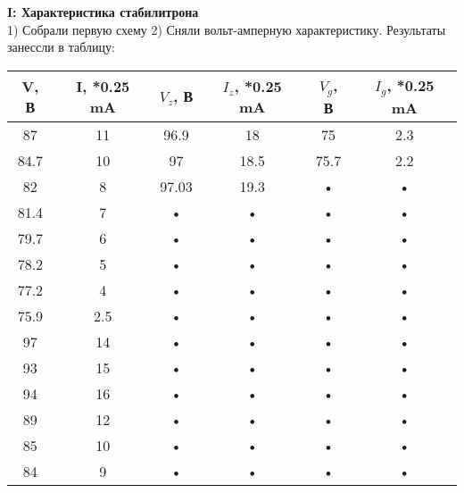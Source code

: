 \documentclass[a4paper,12pt]{article} %
\begin{document}
\textbf{I: Характеристика стабилитрона}\\
1) Собрали первую схему
2) Сняли вольт-амперную характеристику. Результаты занессли в таблицу: \\
\begin{tabular}{|c|c|c|c|c|c|}
\hline 
V, В & I, *0.25 mA & $V_z$, В & $I_z$, *0.25 mA & $V_g$, В & $I_g$, *0.25 mA \\ 
\hline 
87 & 11 & 96.9 & 18 & 75 & 2.3 \\ 
\hline 
84.7 & 10 & 97 & 18.5 & 75.7 & 2.2 \\ 
\hline 
82 & 8 & 97.03 & 19.3 & • & • \\ 
\hline 
81.4 & 7 & • & • & • & • \\ 
\hline 
79.7 & 6 & • & • & • & • \\ 
\hline 
78.2 & 5 & • & • & • & • \\ 
\hline 
77.2 & 4 & • & • & • & • \\ 
\hline 
75.9 & 2.5 & • & • & • & • \\ 
\hline 
97 & 14 & • & • & • & • \\ 
\hline 
93 & 15 & • & • & • & • \\ 
\hline 
94 & 16 & • & • & • & • \\ 
\hline 
89 & 12 & • & • & • & • \\ 
\hline 
85 & 10 & • & • & • & • \\ 
\hline 
84 & 9 & • & • & • & • \\ 
\hline 
\end{tabular} 
\end{document}
